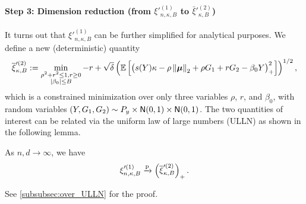 \paragraph{Step 3: Dimension reduction (from $\xi'^{(1)}_{n, \kappa, B}$ to $\bar\xi'^{(2)}_{\kappa, B}$)} It turns out that $\xi'^{(1)}_{n, \kappa, B}$ can be further simplified for analytical purposes. We define a new (deterministic) quantity
\begin{equation*}
    \overline\xi'^{(2)}_{\kappa, B} :=  \min_{ \substack{ \rho^2 + r^2 \le 1, r \ge 0 \\  \left|{\beta_0}\right| \le B } }
    -r + \sqrt{\delta} \left( \mathbb{E}\left[ \bigl(  s(Y) \kappa - \rho \left\|{\text{\boldmath $\mu$}}\right\|_2 + \rho G_1 + rG_2 - \beta_0 Y \bigr)_+^2 \right] \right)^{1/2},
\end{equation*}
which is a constrained minimization over only three variables $\rho$, $r$, and $\beta_0$, with random variables $(Y, G_1, G_2) \sim P_y \times {\sf N}(0, 1) \times {\sf N}(0, 1)$. The two quantities of interest can be related via the uniform law of large numbers (ULLN) as shown in the following lemma.

\begin{lem}[ULLN]
\label{lem:over_ULLN}    
As $n,d \to \infty$, we have
    \begin{equation*}
        \xi'^{(1)}_{n, \kappa, B}  \xrightarrow{\mathrm{p}} \left( \overline\xi'^{(2)}_{\kappa, B} \right)_+.
    \end{equation*}
\end{lem}
\noindent
See \cref{subsubsec:over_ULLN} for the proof.


